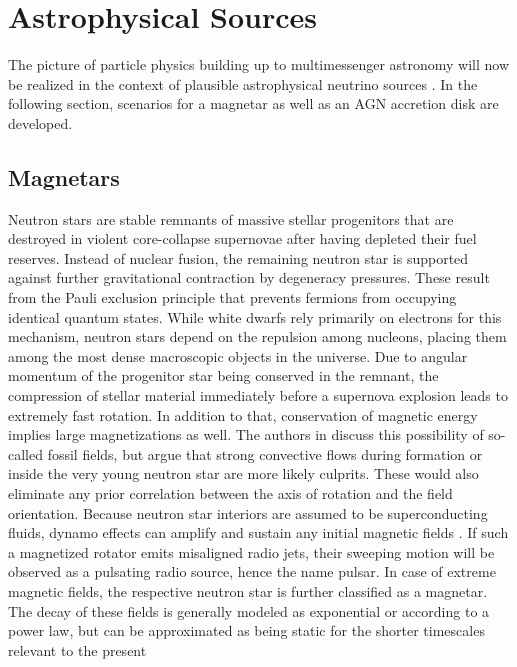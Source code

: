 \section{Astrophysical Sources}
\label{sec:sources}

The picture of particle physics building up to multimessenger astronomy will now be realized in the context of plausible astrophysical
neutrino sources \cite{Becker_2008}. In the following section, scenarios for a magnetar as well as an AGN accretion disk are developed.



\subsection{Magnetars}
\label{sub:magnetars}

Neutron stars are stable remnants of massive stellar progenitors that are destroyed in violent core-collapse supernovae after having
depleted their fuel reserves. Instead of nuclear fusion, the remaining neutron star is supported against further gravitational
contraction by degeneracy pressures. These result from the Pauli exclusion principle that prevents fermions from occupying identical
quantum states. While white dwarfs rely primarily on electrons for this mechanism, neutron stars depend on the repulsion among
nucleons, placing them among the most dense macroscopic objects in the universe. Due to angular momentum of the progenitor
star being conserved in the remnant, the compression of stellar material immediately before a supernova explosion leads to
extremely fast rotation. In addition to that, conservation of magnetic energy implies large magnetizations as well.
The authors in \cite{Thompson_1993} discuss this possibility of so-called fossil fields, but argue that strong convective flows
during formation or inside the very young neutron star are more likely culprits. These would also eliminate any prior correlation
between the axis of rotation and the field orientation. Because neutron star interiors are assumed to be superconducting fluids,
dynamo effects can amplify and sustain any initial magnetic fields \cite{Haskell_2018}. If such a magnetized rotator emits misaligned
radio jets, their sweeping motion will be observed as a pulsating radio source, hence the name pulsar. In case of extreme magnetic
fields, the respective neutron star is further classified as a magnetar. The decay of these fields is generally modeled
as exponential or according to a power law, but can be approximated as being static for the shorter timescales relevant to the present
